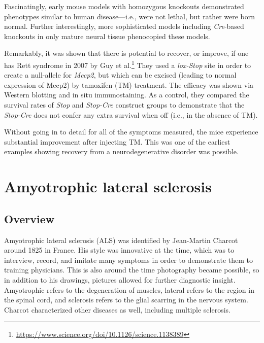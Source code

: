 Fascinatingly, early mouse models with homozygous knockouts demonstrated phenotypes similar to human disease---i.e., were not lethal, but rather were born normal. Further interestingly, more sophisticated models including \textit{Cre}-based knockouts in only mature neural tissue phenocopied these models.\newline 

Remarkably, it was shown that there is potential to recover, or improve, if one has Rett syndrome in 2007 by Guy et al.\footnote{\url{https://www.science.org/doi/10.1126/science.1138389}} They used a \textit{lox-Stop} site in order to create a null-allele for \textit{Mecp2}, but which can be excised (leading to normal expression of Mecp2) by tamoxifen (TM) treatment. The efficacy was shown via Western blotting and in situ immunostaining. As a control, they  compared the survival rates of \textit{Stop} and \textit{Stop-Cre} construct groups to demonstrate that the \textit{Stop-Cre} does not confer any extra survival when off (i.e., in the absence of TM).\newline

Without going in to detail for all of the symptoms measured, the mice experience substantial improvement after injecting TM. This was one of the earliest examples showing recovery from a neurodegenerative disorder was possible. 


\section{Amyotrophic lateral sclerosis}

\label{sec:ALS}

\subsection*{Overview}

Amyotrophic lateral sclerosis (ALS) was identified by Jean-Martin Charcot around 1825 in France. His style was innovative at the time, which was to interview, record, and imitate many symptoms in order to demonstrate them to training physicians. This is also around the time photography became possible, so in addition to his drawings, pictures allowed for further diagnostic insight. Amyotrophic refers to the degeneration of muscles, lateral refers to the region in the spinal cord, and sclerosis refers to the glial scarring in the nervous system. Charcot characterized other diseases as well, including multiple sclerosis.\newline

